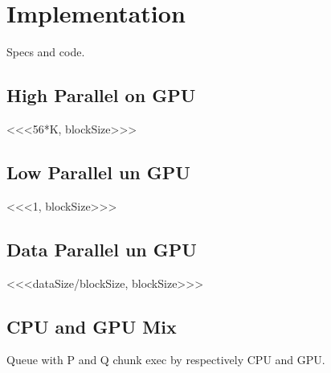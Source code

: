 \chapter{Implementation} \label{chap:impl}

Specs and code.
	
\section{High Parallel on GPU}
	<<<56*K, blockSize>>>
\section{Low Parallel un GPU}
<<<1, blockSize>>>
\section{Data Parallel un GPU}
<<<dataSize/blockSize, blockSize>>>
\section{CPU and GPU Mix}
Queue with P and Q chunk exec by respectively CPU and GPU.
